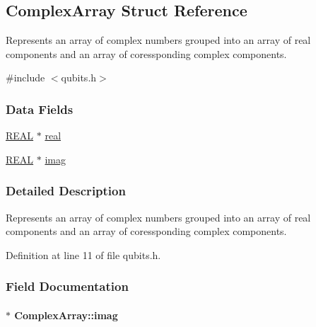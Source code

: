 \hypertarget{structComplexArray}{}\subsection{Complex\+Array Struct Reference}
\label{structComplexArray}


Represents an array of complex numbers grouped into an array of real components and an array of coressponding complex components.  




{\ttfamily \#include $<$qubits.\+h$>$}

\subsubsection*{Data Fields}
\begin{DoxyCompactItemize}
\item 
\hyperlink{precision_8h_a4b654506f18b8bfd61ad2a29a7e38c25}{R\+E\+AL} $\ast$ \hyperlink{structComplexArray_a4195cac6c784ea1b6271f1c7dba1548a}{real}
\item 
\hyperlink{precision_8h_a4b654506f18b8bfd61ad2a29a7e38c25}{R\+E\+AL} $\ast$ \hyperlink{structComplexArray_a79dde47c7ae530c79cebfdf57b225968}{imag}
\end{DoxyCompactItemize}


\subsubsection{Detailed Description}
Represents an array of complex numbers grouped into an array of real components and an array of coressponding complex components. 

Definition at line 11 of file qubits.\+h.



\subsubsection{Field Documentation}
\paragraph[{\texorpdfstring{imag}{imag}}]{$\ast$ Complex\+Array\+::imag}\hypertarget{structComplexArray_a79dde47c7ae530c79cebfdf57b225968}{}\label{structComplexArray_a79dde47c7ae530c79cebfdf57b225968}



